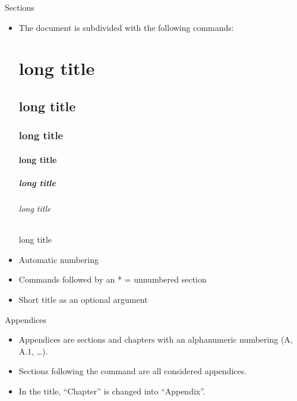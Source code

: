 \begin{frame}[fragile]{Sections}
	\begin{itemize}
		\item The document is subdivided with the following commands:
\begin{codesource}
	\part[short title]{long title}
	\chapter[short title]{long title}
	\section[short title]{long title}
	\subsection[short title]{long title}
	
	\subsubsection[short title]{long title} 	%
	
	\paragraph[short title]{long title} 		%
	\subparagraph[short title]{long title} 	%
\end{codesource}

		\item Automatic numbering
		\item Commands followed by an * = unnumbered section 
		\item Short title as an optional argument
	\end{itemize}
\end{frame}

\begin{frame}[fragile,c]{Appendices}
	\begin{itemize}
		\item Appendices are sections and chapters with an alphanumeric numbering (A,
		A.1, \ldots).
		\item Sections following the  command are all considered appendices.
		\item In the title, ``Chapter'' is changed into ``Appendix''.
	\end{itemize}
\end{frame}

